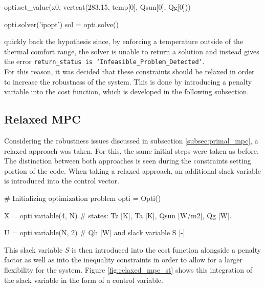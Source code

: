 \begin{python}
opti.set_value(x0, vertcat(283.15, temp[0], Qsun[0], Qg[0]))

opti.solver('ipopt')
sol = opti.solve()
\end{python}

quickly back the hypothesis since, by enforcing a temperature outside of the thermal comfort range, the solver is unable to return a solution and instead gives the error \texttt{return\_status is `Infeasible\_Problem\_Detected'}.\\

For this reason, it was decided that these constraints should be relaxed in order to increase the robustness of the system. This is done by introducing a penalty variable into the cost function, which is developed in the following subsection.

\newpage
\subsection{Relaxed MPC}
\label{subsec:relaxed_mpc}
Considering the robustness issues discussed in subsection \ref{subsec:primal_mpc}, a relaxed approach was taken. For this, the same initial steps were taken as before. The distinction between both approaches is seen during the constraints setting portion of the code. When taking a relaxed approach, an additional slack variable is introduced into the control vector. 

\begin{python}
# Initializing optimization problem
opti = Opti()

X = opti.variable(4, N)  # states: Tz [K], Ta [K], Qsun [W/m2], Qg [W].

U = opti.variable(N, 2)  # Qh [W] and slack variable S [-]
\end{python}

This slack variable $S$ is then introduced into the cost function alongside a penalty factor as well as into the inequality constraints in order to allow for a larger flexibility for the system. Figure \ref{fig:relaxed_mpc_st} shows this integration of the slack variable in the form of a control variable.

